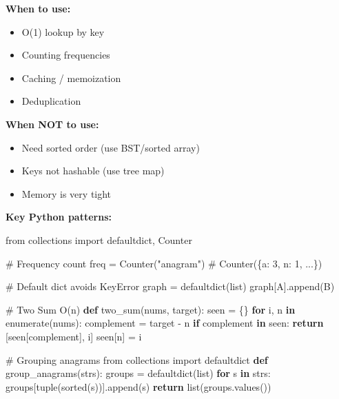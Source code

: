 \documentclass[11pt]{article}
\providecommand{\tightlist}{\setlength{\itemsep}{1pt}\setlength{\parskip}{0pt}}
\newenvironment{Shaded}{\begin{snugshade}}{\end{snugshade}}
\newcommand{\BuiltInTok}[1]{\textcolor[rgb]{0.50,0.55,0.55}{#1}}
\newcommand{\CommentTok}[1]{\textcolor[rgb]{0.48,0.49,0.49}{#1}}
\newcommand{\ControlFlowTok}[1]{\textcolor[rgb]{0.99,0.74,0.29}{\textbf{#1}}}
\newcommand{\ImportTok}[1]{\textcolor[rgb]{0.15,0.68,0.38}{#1}}
\newcommand{\KeywordTok}[1]{\textcolor[rgb]{0.81,0.81,0.76}{\textbf{#1}}}
\newcommand{\NormalTok}[1]{\textcolor[rgb]{0.81,0.81,0.76}{#1}}
\newcommand{\OperatorTok}[1]{\textcolor[rgb]{0.81,0.81,0.76}{#1}}
\newcommand{\StringTok}[1]{\textcolor[rgb]{0.96,0.31,0.31}{#1}}
\begin{document}
\textbf{When to use:}

\begin{itemize}
\tightlist
\item
  O(1) lookup by key
\item
  Counting frequencies
\item
  Caching / memoization
\item
  Deduplication
\end{itemize}

\textbf{When NOT to use:}

\begin{itemize}
\tightlist
\item
  Need sorted order (use BST/sorted array)
\item
  Keys not hashable (use tree map)
\item
  Memory is very tight
\end{itemize}

\textbf{Key Python patterns:}


\begin{Shaded}
\begin{Highlighting}[]
\ImportTok{from}\NormalTok{ collections }\ImportTok{import}\NormalTok{ defaultdict, Counter}

\CommentTok{\# Frequency count}
\NormalTok{freq }\OperatorTok{=}\NormalTok{ Counter(}\StringTok{"anagram"}\NormalTok{)            }\CommentTok{\# Counter(\{\textquotesingle{}a\textquotesingle{}: 3, \textquotesingle{}n\textquotesingle{}: 1, ...\})}

\CommentTok{\# Default dict avoids KeyError}
\NormalTok{graph }\OperatorTok{=}\NormalTok{ defaultdict(}\BuiltInTok{list}\NormalTok{)}
\NormalTok{graph[}\StringTok{\textquotesingle{}A\textquotesingle{}}\NormalTok{].append(}\StringTok{\textquotesingle{}B\textquotesingle{}}\NormalTok{)}

\CommentTok{\# Two Sum O(n)}
\KeywordTok{def}\NormalTok{ two\_sum(nums, target):}
\NormalTok{    seen }\OperatorTok{=}\NormalTok{ \{\}}
    \ControlFlowTok{for}\NormalTok{ i, n }\KeywordTok{in} \BuiltInTok{enumerate}\NormalTok{(nums):}
\NormalTok{        complement }\OperatorTok{=}\NormalTok{ target }\OperatorTok{{-}}\NormalTok{ n}
        \ControlFlowTok{if}\NormalTok{ complement }\KeywordTok{in}\NormalTok{ seen:}
            \ControlFlowTok{return}\NormalTok{ [seen[complement], i]}
\NormalTok{        seen[n] }\OperatorTok{=}\NormalTok{ i}

\CommentTok{\# Grouping anagrams}
\ImportTok{from}\NormalTok{ collections }\ImportTok{import}\NormalTok{ defaultdict}
\KeywordTok{def}\NormalTok{ group\_anagrams(strs):}
\NormalTok{    groups }\OperatorTok{=}\NormalTok{ defaultdict(}\BuiltInTok{list}\NormalTok{)}
    \ControlFlowTok{for}\NormalTok{ s }\KeywordTok{in}\NormalTok{ strs:}
\NormalTok{        groups[}\BuiltInTok{tuple}\NormalTok{(}\BuiltInTok{sorted}\NormalTok{(s))].append(s)}
    \ControlFlowTok{return} \BuiltInTok{list}\NormalTok{(groups.values())}
\end{Highlighting}
\end{Shaded}
\end{document}
